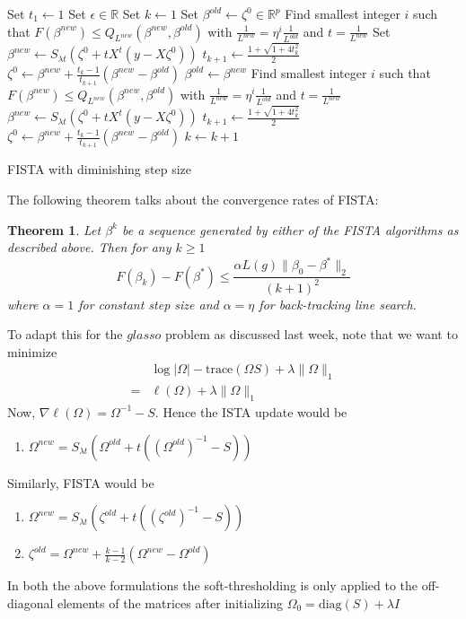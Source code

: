 \documentclass[12pt, leqno]{article}
\providecommand{\norm}[1]{\lVert#1\rVert} %
\newtheorem{thm}{Theorem}
\begin{document}
\begin{algorithm}
\begin{algorithmic}
\State Set $t_1 \gets 1$
\State Set $\epsilon \in \mathbb{R}$
\State Set $k \gets 1$
\State Set $\beta^{old} \gets \zeta^0 \in \mathbb{R}^p$
\State Find smallest integer $i$ such that $F(\beta^{new}) \leq Q_{L^{new}}(\beta^{new},\beta^{old})$ with $\frac{1}{L^{new}} = \eta^i \frac{1}{L^{old}}$ and $t = \frac{1}{L^{new}}$
\State Set $\beta^{new} \gets S_{\lambda t} (\zeta^0 + t X^t (y -
X \zeta^0))$
\State $t_{k+1} \gets \frac{1 + \sqrt{1+4t_k^2}}{2}$
\State $\zeta^{0} \gets \beta^{new} + \frac{t_k-1}{t_{k+1}}(\beta^{new} - \beta^{old})$
\While {$\norm{\beta^{new} - \beta^{old}}_{\infty} \geq \epsilon$}
	\State $\beta^{old} \gets \beta^{new}$
\State Find smallest integer $i$ such that $F(\beta^{new}) \leq Q_{L^{new}}(\beta^{new},\beta^{old})$ with $\frac{1}{L^{new}} = \eta^i \frac{1}{L^{old}}$ and $t = \frac{1}{L^{new}}$
   \State $\beta^{new} \gets S_{\lambda t} (\zeta^0 + t X^t (y -
X \zeta^{0}))$
\State $t_{k+1} \gets \frac{1 + \sqrt{1+4t_k^2}}{2}$
\State $\zeta^{0} \gets \beta^{new} + \frac{t_k-1}{t_{k+1}}(\beta^{new} - \beta^{old})$
\State $k \gets k+1$
    \EndWhile
\end{algorithmic}
\caption{FISTA with diminishing step size}
\end{algorithm}

The following theorem talks about the convergence rates of FISTA:
\begin{thm}
Let $\beta^k$ be a sequence generated by either of the FISTA algorithms as described above. Then for any $k\geq 1$
$$
F(\beta_k) - F(\beta^*) \leq \frac{\alpha L(g) \norm{\beta_0 - \beta^*}_2}{(k+1)^2}
$$
where $\alpha = 1$ for constant step size and $\alpha = \eta$ for back-tracking line search.
\end{thm}

To adapt this for the $glasso$ problem as discussed last week, note that we want to minimize
\begin{align*}
&\log |\Omega| - \text{trace}(\Omega S) + \lambda \norm{\Omega}_1 \\
=&\ell(\Omega) + \lambda \norm{\Omega}_1
\end{align*}
Now, $\nabla \ell(\Omega) = \Omega^{-1} - S$. Hence the ISTA update would be 
\begin{enumerate}
\item $\Omega^{new} = S_{\lambda t}(\Omega^{old} + t ((\Omega^{old})^{-1} - S))$
\end{enumerate}
Similarly, FISTA would be 
\begin{enumerate}
\item $\Omega^{new} = S_{\lambda t}(\zeta^{old} + t ((\zeta^{old})^{-1} - S))$
\item $\zeta^{old} = \Omega^{new} + \frac{k-1}{k-2}(\Omega^{new}  - \Omega^{old} )$
\end{enumerate}
In both the above formulations the soft-thresholding is only applied to the off-diagonal elements of the matrices after initializing $\Omega_0 = \text{diag} (S) + \lambda I$
\end{document}
